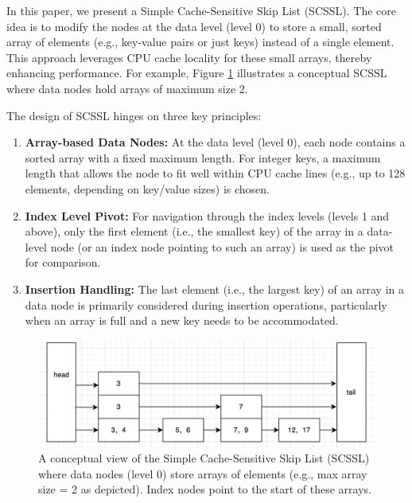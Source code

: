 \documentclass[sigconf, nonacm, letterpaper,top=2cm,bottom=2cm,left=3cm,right=3cm,marginparwidth=1.75cm]{acmart}
\begin{document}
In this paper, we present a Simple Cache-Sensitive Skip List (SCSSL). The core idea is to modify the nodes at the data level (level 0) to store a small, sorted array of elements (e.g., key-value pairs or just keys) instead of a single element. This approach leverages CPU cache locality for these small arrays, thereby enhancing performance. For example, Figure \ref{fig:conceptual_scssl} illustrates a conceptual SCSSL where data nodes hold arrays of maximum size 2.


The design of SCSSL hinges on three key principles:
\begin{enumerate}
    \item \textbf{Array-based Data Nodes:} At the data level (level 0), each node contains a sorted array with a fixed maximum length. For integer keys, a maximum length that allows the node to fit well within CPU cache lines (e.g., up to 128 elements, depending on key/value sizes) is chosen.
    \item \textbf{Index Level Pivot:} For navigation through the index levels (levels 1 and above), only the first element (i.e., the smallest key) of the array in a data-level node (or an index node pointing to such an array) is used as the pivot for comparison.
    \item \textbf{Insertion Handling:} The last element (i.e., the largest key) of an array in a data node is primarily considered during insertion operations, particularly when an array is full and a new key needs to be accommodated.
\end{enumerate}

\begin{figure}[htbp]
\centering
\includegraphics[width=0.7\linewidth]{figures/skiplist.png}
\caption{A conceptual view of the Simple Cache-Sensitive Skip List (SCSSL) where data nodes (level 0) store arrays of elements (e.g., max array size = 2 as depicted). Index nodes point to the start of these arrays.}
\label{fig:conceptual_scssl}
\end{figure}
\end{document}
